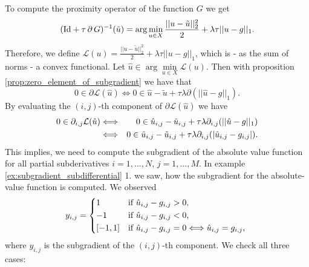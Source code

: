 \documentclass{scrreprt}
\begin{document}
            To compute the proximity operator of the function $G$ we get
                $$
                    (\textnormal{Id} + \tau\,\partial\,G)^{-1}(\tilde{u}) = \arg \min_{u \in X} \frac{||u - \tilde{u}||_{2}^{2}}{2} + \lambda\tau||u - g||_{1}.
                $$
            Therefore, we define $\mathcal{L}(u) = \frac{||u - \tilde{u}||_{2}^{2}}{2} + \lambda\tau||u - g||_{1}$, which is - as the sum of norms - a convex functional. Let $\hat{u} \in \arg \min\limits_{u \in X} \mathcal{L}(u)$. Then with proposition \ref{prop:zero_element_of_subgradient} we have that
                $$
                    0 \in \partial \mathcal{L}(\hat{u}) \Longleftrightarrow 0 \in \hat{u} - \tilde{u} + \tau\lambda \partial(||\hat{u} - g||_{1}).
                $$
            By evaluating the $(i,j)$-th component of $\partial\mathcal{L}(\hat{u})$ we have
                \begin{eqnarray}
                    0 \in \partial_{i,j} \mathcal{L}(\hat{u}) &\Longleftrightarrow& 0 \in \hat{u}_{i,j} - \tilde{u}_{i,j} + \tau\lambda \partial_{i,j}(||\hat{u} - g||_{1}) \notag \\
                    &\Longleftrightarrow& 0 \in \hat{u}_{i,j} - \tilde{u}_{i,j} + \tau\lambda \partial_{i,j} (|\hat{u}_{i,j} - g_{i,j}|). \notag
                \end{eqnarray}
            This implies, we need to compute the subgradient of the absolute value function for all partial subderivatives $i = 1, ..., N$, $j = 1, ..., M$. In example \ref{ex:subgradient_subdifferential} 1. we saw, how the subgradient for the absolute-value function is computed. We observed
                $$
                    y_{i,j} =
                        \begin{dcases*}
                            1 & \textnormal{if $\hat{u}_{i,j} - g_{i,j} > 0$,} \\
                            -1 & \textnormal{if $\hat{u}_{i,j} - g_{i,j} < 0$,} \\
                            [-1, 1] & \textnormal{if $\hat{u}_{i,j} - g_{i,j} = 0 \Longleftrightarrow \hat{u}_{i,j} = g_{i,j}$,}
                        \end{dcases*}
                $$
            where $y_{i,j}$ is the subgradient of the $(i,j)$-th component. We check all three cases:
\end{document}
